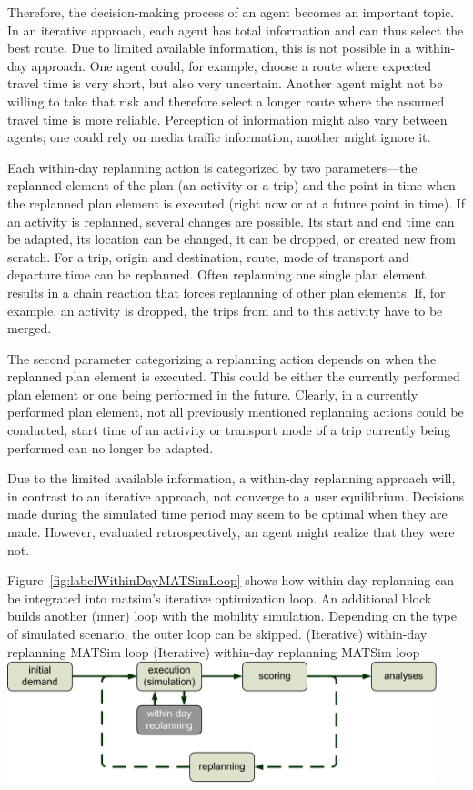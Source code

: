 Therefore, the decision-making process of an agent becomes an important topic. In an iterative approach, each agent has total information and can thus select the best route. Due to limited available information, this is not possible in a within-day approach. One agent could, for example, choose a route where expected travel time is very short, but also very uncertain. Another agent might not be willing to take that risk and therefore select a longer route where the assumed travel time is more reliable. Perception of information might also vary between agents; one could rely on media traffic information, another might ignore it.

Each within-day replanning action is categorized by two parameters---the replanned element of the plan (an activity or a trip) and the point in time when the replanned plan element is executed (right now or at a future point in time). If an activity is replanned, several changes are possible. Its start and end time can be adapted, its location can be changed, it can be dropped, or created new from scratch. For a trip, origin and destination, route, mode of transport and departure time can be replanned. Often replanning one single plan element results in a chain reaction that forces replanning of other plan elements. If, for example, an activity is dropped, the trips from and to this activity have to be merged.

The second parameter categorizing a replanning action depends on when the replanned plan element is executed. This could be either the currently performed plan element or one being performed in the future. Clearly, in a currently performed plan element, not all previously mentioned replanning actions could be conducted, \eg start time of an activity or transport mode of a trip currently being performed can no longer be adapted.

Due to the limited available information, a within-day replanning approach will, in contrast to an iterative approach, not converge to a user equilibrium. Decisions made during the simulated time period may seem to be optimal when they are made. However, evaluated retrospectively, an agent might realize that they were not.

Figure~\ref{fig:labelWithinDayMATSimLoop} shows how within-day replanning can be integrated into \gls{matsim}'s iterative optimization loop. An additional block builds another (inner) loop with the mobility simulation. Depending on the type of simulated scenario, the outer loop can be skipped.
\createfigure%
{(Iterative) within-day replanning MATSim loop}%
{(Iterative) within-day replanning MATSim loop}%
{\label{fig:labelWithinDayMATSimLoop}}%
{\includegraphics[width=12.5cm, angle=0]{extending/figures/WithinDayReplanning/WithinDayMATSimLoop}}%
{}%

